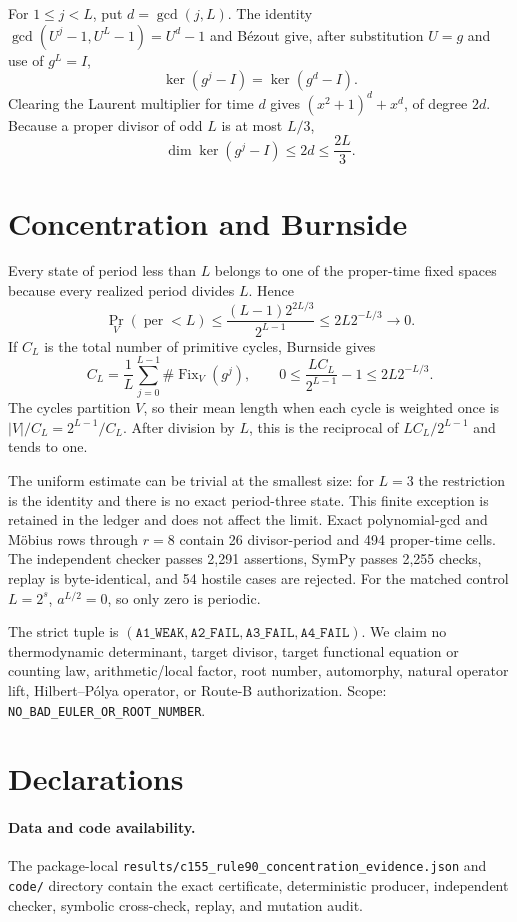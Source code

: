 \documentclass[10pt]{article}
\begin{document}
For $1\leq j<L$, put $d=\gcd(j,L)$.  The identity
$\gcd(U^j-1,U^L-1)=U^d-1$ and B\'ezout give, after substitution $U=g$ and
use of $g^L=I$,
\[
\ker(g^j-I)=\ker(g^d-I).
\]
Clearing the Laurent multiplier for time $d$ gives
$(x^2+1)^d+x^d$, of degree $2d$.  Because a proper divisor of odd $L$ is at
most $L/3$,
\begin{equation}
\dim\ker(g^j-I)\leq2d\leq\frac{2L}{3}.\tag{1}
\end{equation}

\section{Concentration and Burnside}
Every state of period less than $L$ belongs to one of the proper-time fixed
spaces because every realized period divides $L$.  Hence
\[
\Pr_V(\operatorname{per}<L)
\leq\frac{(L-1)2^{2L/3}}{2^{L-1}}
\leq2L2^{-L/3}\longrightarrow0.\tag{2}
\]
If $C_L$ is the total number of primitive cycles, Burnside gives
\[
C_L=\frac1L\sum_{j=0}^{L-1}\#\operatorname{Fix}_V(g^j),
\qquad
0\leq\frac{LC_L}{2^{L-1}}-1\leq2L2^{-L/3}.\tag{3}
\]
The cycles partition $V$, so their mean length when each cycle is weighted
once is $|V|/C_L=2^{L-1}/C_L$.  After division by $L$, this is the reciprocal
of $LC_L/2^{L-1}$ and tends to one.

\newpage
The uniform estimate can be trivial at the smallest size: for $L=3$ the
restriction is the identity and there is no exact period-three state.  This
finite exception is retained in the ledger and does not affect the limit.
Exact polynomial-gcd and M\"obius rows through $r=8$ contain 26 divisor-period
and 494 proper-time cells.  The independent checker passes 2,291 assertions,
SymPy passes 2,255 checks, replay is byte-identical, and 54 hostile cases are
rejected.  For the matched control $L=2^s$, $a^{L/2}=0$, so only zero is
periodic.

The strict tuple is $(\texttt{A1\_WEAK},\texttt{A2\_FAIL},
\texttt{A3\_FAIL},\texttt{A4\_FAIL})$.  We claim no thermodynamic
determinant, target divisor, target functional equation or counting law,
arithmetic/local factor, root number, automorphy, natural operator lift,
Hilbert--P\'olya operator, or Route-B authorization.  Scope:
\texttt{NO\_BAD\_EULER\_OR\_ROOT\_NUMBER}.

\section*{Declarations}
\paragraph{Data and code availability.}
The package-local \texttt{results/c155\_rule90\_concentration\_evidence.json}
and \texttt{code/} directory contain the exact certificate, deterministic
producer, independent checker, symbolic cross-check, replay, and mutation
audit.
\end{document}
